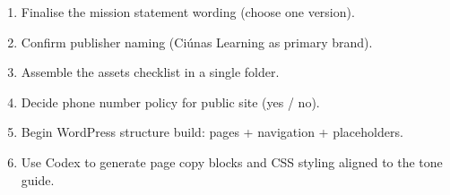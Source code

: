 \documentclass[11pt,a4paper]{article}
\begin{document}
\begin{enumerate}
  \item Finalise the mission statement wording (choose one version).
  \item Confirm publisher naming (Ci\'unas Learning as primary brand).
  \item Assemble the assets checklist in a single folder.
  \item Decide phone number policy for public site (yes / no).
  \item Begin WordPress structure build: pages + navigation + placeholders.
  \item Use Codex to generate page copy blocks and CSS styling aligned to the tone guide.
\end{enumerate}
\end{document}
